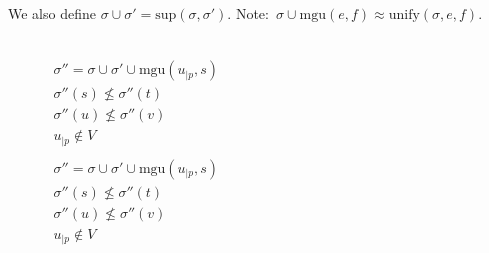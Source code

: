 We also define $\sigma \cup \sigma' = \text{sup}({\sigma, \sigma'})$.
Note:~$\sigma \cup \text{mgu}(e,f) \approx \text{unify}(\sigma, e, f)$.

\begin{figure}
  \begin{center}

    \DP{} \\[12pt]

    \DP{}
    $\begin{matrix}
        \sigma'' = \sigma \cup \sigma' \cup \text{mgu}(u_{|p}, s) \\
        \sigma''(s) \not\leq \sigma''(t) \\
        \sigma''(u) \not\leq \sigma''(v) \\
        u_{|p} \not\in V \\
    \end{matrix}$ \\[12pt]

    \DP{}
    $\begin{matrix}
        \sigma'' = \sigma \cup \sigma' \cup \text{mgu}(u_{|p}, s) \\
        \sigma''(s) \not\leq \sigma''(t) \\
        \sigma''(u) \not\leq \sigma''(v) \\
        u_{|p} \not\in V \\
    \end{matrix}$ \\[12pt]

    \doubleLine{}
    \UIC{}
    \DP{} \\[12pt]




\end{center}
\end{figure}
